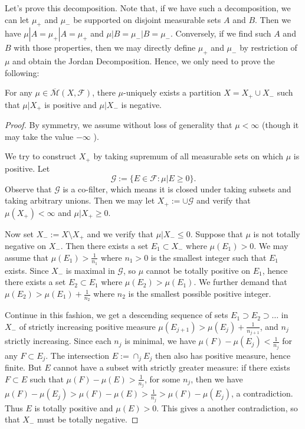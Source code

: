Let's prove this decomposition. Note that, if we have such a decomposition, we can let $\mu_+$ and $\mu_-$ be supported on disjoint measurable sets $A$ and $B$. Then we have $\mu|A = \mu_+|A = \mu_+$ and $\mu|B = \mu_-|B = \mu_-$. Conversely, if we find such $A $ and $B$ with those properties, then we may directly define $\mu_+$ and $\mu_-$ by restriction of $\mu$ and obtain the Jordan Decomposition. Hence, we only need to prove the following:

\begin{theorem}
	For any $\mu \in \overline{\mathcal{M}} (X, \mathcal{F})$, there $\mu$-uniquely exists a partition $X = X_+ \cup X_-$ such that $\mu|X_+$ is positive and $\mu|X_-$ is negative.
\end{theorem}
\begin{proof}
	By symmetry, we assume without loss of generality that $\mu < \infty $ (though it may take the value $- \infty $ ).

	We try to construct $X_+$ by taking supremum of all measurable sets on which $\mu$ is positive. Let
	\[
		\mathcal{G} := \{E \in \mathcal{F}: \mu|E \ge 0\} 
	.\] 
	Observe that $\mathcal{G}$ is a co-filter, which means it is closed under taking subsets and taking arbitrary unions. Then we may let  $X_+ := \cup \mathcal{G}$ and verify that $\mu(X_+) < \infty $ and $\mu| X_+ \ge 0$.

	Now set $X_- := X \setminus  X_+$ and we verify that $\mu|X_- \le 0$. Suppose that $\mu$ is not totally negative on $X_-$. Then there exists a set $E_1 \subset X_-$ where $\mu(E_1) > 0$. We may assume that $\mu(E_1) > \frac{1}{n_1}$ where $n_1>0$ is the smallest integer such that  $E_1$ exists. Since $X_-$ is maximal in $\mathcal{G}$, so $\mu$ cannot be totally positive on $E_1$, hence there exists a set $E_2 \subset E_1$ where $\mu(E_2) > \mu(E_1)$. We further demand that $\mu(E_2) > \mu(E_1) + \frac{1}{n_2}$ where $n_2$ is the smallest possible positive integer. 

	Continue in this fashion, we get a descending sequence of sets $E_1 \supset E_2 \supset \ldots$ in $X_-$ of strictly increasing positive measure $\mu(E_{j+1}) > \mu(E_j) + \frac{1}{n_{j+1}}$, and $n_j$ strictly increasing. Since each $n_j$ is minimal, we have $\mu(F) - \mu(E_j) < \frac{1}{n_j}$ for any $F \subset E_{j}$. The intersection $E := \cap _j E_j$ then also has positive measure, hence finite. But $E$ cannot have a subset with strictly greater measure: if there exists $F \subset E$ such that $\mu(F) - \mu(E) > \frac{1}{n_j}$, for some $n_j$, then we have $\mu(F) - \mu(E_j) > \mu(F) - \mu(E) > \frac{1}{n_j} > \mu(F) - \mu(E_j)$, a contradiction. Thus $E$ is totally positive and $\mu(E)>0$. This gives a another contradiction, so that $X_-$ must be totally negative.
\end{proof}


